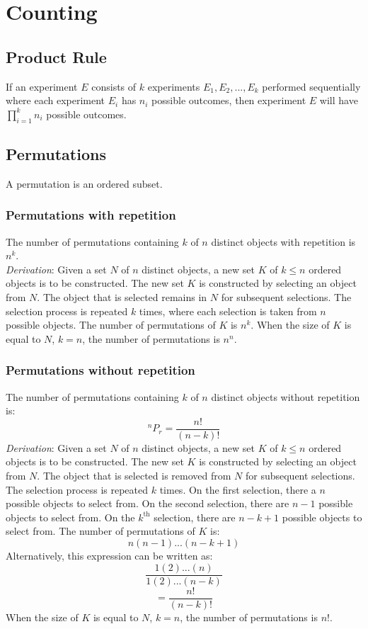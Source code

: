 \documentclass{article}
\begin{document}
\newpage
\section{Counting}

\subsection{Product Rule}

If an experiment $E$ consists of $k$ experiments $E_1, E_2,..., E_k$ performed sequentially where each experiment $E_i$ has $n_i$ possible outcomes, then experiment $E$ will have $\prod_{i=1}^k n_i$ possible outcomes.

\subsection{Permutations}

A permutation is an ordered subset.

\subsubsection{Permutations with repetition}

The number of permutations containing $k$ of $n$ distinct objects with repetition is $n^k$.\\
\textit{Derivation}: Given a set $N$ of $n$ distinct objects, a new set $K$ of $k \leq n$ ordered objects is to be constructed. The new set $K$ is constructed by selecting an object from $N$. The object that is selected remains in $N$ for subsequent selections. The selection process is repeated $k$ times, where each selection is taken from $n$ possible objects. The number of permutations of $K$ is $n^k$. When the size of $K$ is equal to $N$, $k=n$, the number of permutations is $n^n$.

\subsubsection{Permutations without repetition}

The number of permutations containing $k$ of $n$ distinct objects without repetition is:
\[^n P_r = \frac{n!}{(n-k)!}\]
\textit{Derivation}: Given a set $N$ of $n$ distinct objects, a new set $K$ of $k \leq n$ ordered objects is to be constructed. The new set $K$ is constructed by selecting an object from $N$. The object that is selected is removed from $N$ for subsequent selections. The selection process is repeated $k$ times. On the first selection, there a $n$ possible objects to select from. On the second selection, there are $n-1$ possible objects to select from. On the $k^{\mathrm{th}}$ selection, there are $n-k+1$ possible objects to select from. The number of permutations of $K$ is:
\[n(n-1)...(n-k+1)\]
Alternatively, this expression can be written as:
\[\frac{1(2)...(n)}{1(2)...(n-k)}\]
\[=\frac{n!}{(n-k)!}\]
When the size of $K$ is equal to $N$, $k=n$, the number of permutations is $n!$.
\end{document}
